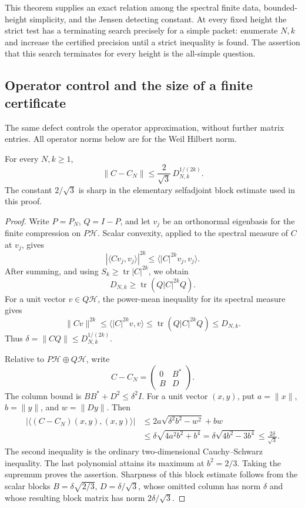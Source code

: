 This theorem supplies an exact relation among the spectral finite
data, bounded-height simplicity, and the Jensen detecting constant.
At every fixed height the strict test has a terminating search
precisely for a simple packet: enumerate \(N,k\) and increase
the certified precision until a strict inequality is found.
The assertion that this search terminates for every height is
the all-simple question.

\subsection{Operator control and the size of a finite certificate}

The same defect controls the operator approximation, without further
matrix entries. All operator norms below are for the Weil Hilbert norm.

\begin{proposition}
\label{prop:fd-even-operator}
For every \(N,k\ge1\),
\[
 \|C-C_N\|\le\frac2{\sqrt3}\,D_{N,k}^{1/(2k)}.
\]
The constant \(2/\sqrt3\) is sharp in the elementary selfadjoint
block estimate used in this proof.
\end{proposition}
\begin{proof}
Write \(P=P_N\), \(Q=I-P\), and let \(v_j\) be an orthonormal
eigenbasis for the finite compression on \(P\mathcal H\).
Scalar convexity, applied to the spectral measure of \(C\) at
\(v_j\), gives
\[
 |\langle Cv_j,v_j\rangle|^{2k}
       \le\langle |C|^{2k}v_j,v_j\rangle.
\]
After summing, and using \(S_k\ge\operatorname{tr}|C|^{2k}\),
we obtain
\[
 D_{N,k}\ge\operatorname{tr}(Q|C|^{2k}Q).
\]
For a unit vector \(v\in Q\mathcal H\), the power-mean
inequality for its spectral measure gives
\[
 \|Cv\|^{2k}\le\langle |C|^{2k}v,v\rangle
       \le\operatorname{tr}(Q|C|^{2k}Q)\le D_{N,k}.
\]
Thus \(\delta=\|CQ\|\le D_{N,k}^{1/(2k)}\).

Relative to \(P\mathcal H\oplus Q\mathcal H\), write
\[
 C-C_N=\begin{pmatrix}0&B^*\\B&D\end{pmatrix}.
\]
The column bound is \(BB^*+D^2\le\delta^2I\).
For a unit vector \((x,y)\), put \(a=\|x\|\),
\(b=\|y\|\), and \(w=\|Dy\|\). Then
\begin{align*}
 |\langle(C-C_N)(x,y),(x,y)\rangle|
 &\le2a\sqrt{\delta^2b^2-w^2}+bw\\
 &\le\delta\sqrt{4a^2b^2+b^4}
   =\delta\sqrt{4b^2-3b^4}
   \le\frac{2\delta}{\sqrt3}.
\end{align*}
The second inequality is the ordinary two-dimensional
Cauchy--Schwarz inequality. The last polynomial attains its
maximum at \(b^2=2/3\). Taking the supremum proves the assertion.
Sharpness of this block estimate follows from the scalar blocks
\(B=\delta\sqrt{2/3}\), \(D=\delta/\sqrt3\), whose omitted
column has norm \(\delta\) and whose resulting block matrix has
norm \(2\delta/\sqrt3\).
\end{proof}

